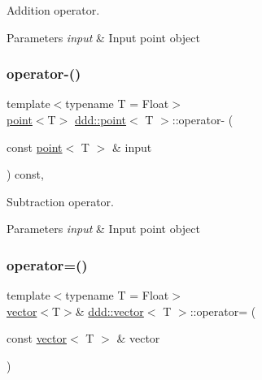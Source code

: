 Addition operator. 


\begin{DoxyParams}{Parameters}
{\em input} & Input point object \\
\hline
\end{DoxyParams}
\mbox{\label{classddd_1_1point_a5621f5a883c88d5588e09f9ff0de6575}} 
\subsubsection{\texorpdfstring{operator-\/()}{operator-()}}
{\footnotesize\ttfamily template$<$typename T = Float$>$ \\
\hyperlink{classddd_1_1point}{point}$<$T$>$ \hyperlink{classddd_1_1point}{ddd\+::point}$<$ T $>$\+::operator-\/ (\begin{DoxyParamCaption}\item[{const \hyperlink{classddd_1_1point}{point}$<$ T $>$ \&}]{input }\end{DoxyParamCaption}) const\hspace{0.3cm}{\ttfamily [inline]}, {\ttfamily [inherited]}}



Subtraction operator. 


\begin{DoxyParams}{Parameters}
{\em input} & Input point object \\
\hline
\end{DoxyParams}
\mbox{\label{classddd_1_1vector_a873d3b0fd4d4a5d7a1b6a9d7e907009d}} 
\subsubsection{\texorpdfstring{operator=()}{operator=()}}
{\footnotesize\ttfamily template$<$typename T = Float$>$ \\
\hyperlink{classddd_1_1vector}{vector}$<$T$>$\& \hyperlink{classddd_1_1vector}{ddd\+::vector}$<$ T $>$\+::operator= (\begin{DoxyParamCaption}\item[{const \hyperlink{classddd_1_1vector}{vector}$<$ T $>$ \&}]{vector }\end{DoxyParamCaption})\hspace{0.3cm}{\ttfamily [inline]}}



